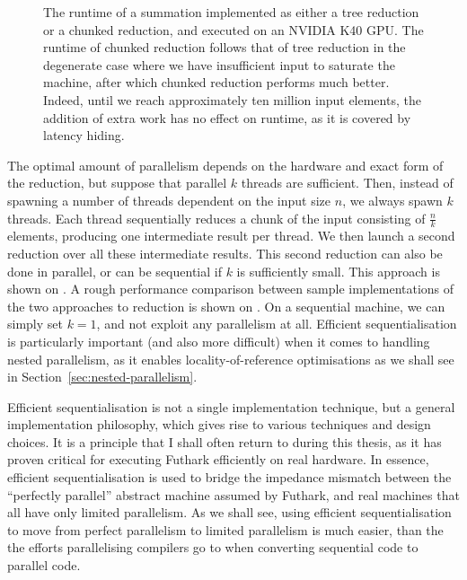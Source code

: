 \begin{figure}
  \centering

  

  \caption{The runtime of a summation implemented as either a tree
    reduction or a chunked reduction, and executed on an NVIDIA K40
    GPU.  The runtime of chunked reduction follows that of tree
    reduction in the degenerate case where we have insufficient input
    to saturate the machine, after which chunked reduction performs
    much better.  Indeed, until we reach approximately ten million
    input elements, the addition of extra work has no effect on
    runtime, as it is covered by latency hiding.}
  \label{fig:tree-vs-chunked}
\end{figure}

The optimal amount of parallelism depends on the hardware and exact
form of the reduction, but suppose that parallel $k$ threads are
sufficient.  Then, instead of spawning a number of threads dependent
on the input size $n$, we always spawn $k$ threads.  Each thread
sequentially reduces a chunk of the input consisting of $\frac{n}{k}$
elements, producing one intermediate result per thread.  We then
launch a second reduction over all these intermediate results.  This
second reduction can also be done in parallel, or can be sequential if
$k$ is sufficiently small.  This approach is shown on
.  A rough performance comparison between
sample implementations of the two approaches to reduction is shown on
.  On a sequential machine, we can simply
set $k=1$, and not exploit any parallelism at all.  Efficient
sequentialisation is particularly important (and also more difficult)
when it comes to handling nested parallelism, as it enables
locality-of-reference optimisations as we shall see in
Section~\ref{sec:nested-parallelism}.

Efficient sequentialisation is not a single implementation technique,
but a general implementation philosophy, which gives rise to various
techniques and design choices.  It is a principle that I shall often
return to during this thesis, as it has proven critical for executing
Futhark efficiently on real hardware.  In essence, efficient
sequentialisation is used to bridge the impedance mismatch between the
``perfectly parallel'' abstract machine assumed by Futhark, and real
machines that all have only limited parallelism.  As we shall see,
using efficient sequentialisation to move from perfect parallelism to
limited parallelism is much easier, than the the efforts parallelising
compilers go to when converting sequential code to parallel code.

